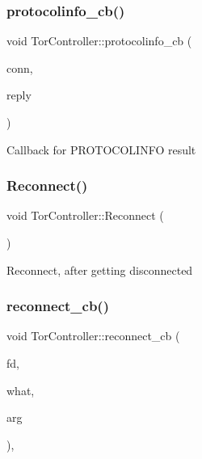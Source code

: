 \subsubsection{\texorpdfstring{protocolinfo\+\_\+cb()}{protocolinfo\_cb()}}
{\footnotesize\ttfamily void Tor\+Controller\+::protocolinfo\+\_\+cb (\begin{DoxyParamCaption}\item[{\mbox{\hyperlink{class_tor_control_connection}{Tor\+Control\+Connection}} \&}]{conn,  }\item[{const \mbox{\hyperlink{class_tor_control_reply}{Tor\+Control\+Reply}} \&}]{reply }\end{DoxyParamCaption})\hspace{0.3cm}{\ttfamily [private]}}

Callback for P\+R\+O\+T\+O\+C\+O\+L\+I\+N\+FO result \mbox{\label{class_tor_controller_ae5d4304836fce79574ec540c5ada8269}} 
\subsubsection{\texorpdfstring{Reconnect()}{Reconnect()}}
{\footnotesize\ttfamily void Tor\+Controller\+::\+Reconnect (\begin{DoxyParamCaption}{ }\end{DoxyParamCaption})}

Reconnect, after getting disconnected \mbox{\label{class_tor_controller_a2fa9614b4fa0e24c57f443b3c56f835c}} 
\subsubsection{\texorpdfstring{reconnect\+\_\+cb()}{reconnect\_cb()}}
{\footnotesize\ttfamily void Tor\+Controller\+::reconnect\+\_\+cb (\begin{DoxyParamCaption}\item[{evutil\+\_\+socket\+\_\+t}]{fd,  }\item[{short}]{what,  }\item[{void $\ast$}]{arg }\end{DoxyParamCaption})\hspace{0.3cm}{\ttfamily [static]}, {\ttfamily [private]}}

